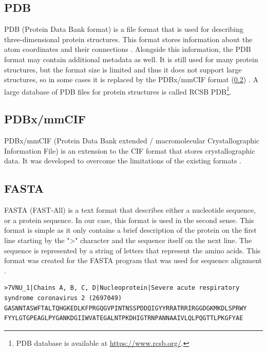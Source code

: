 \subsection{PDB}
\label{subsec:PDB}

PDB (Protein Data Bank format) is a file format that is used for describing three-dimensional protein structures. This format stores information about the atom coordinates and their connections \cite{bernstein1977protein}. Alongside this information, the PDB format may contain additional metadata as well. It is still used for many protein structures, but the format size is limited and thus it does not support large structures, so in some cases it is replaced by the PDBx/mmCIF format (\cref{subsec:PDBx_mmCIF}) \cite{adams2019announcing}. A large database of PDB files for protein structures is called RCSB PDB\footnote{PDB database is available at \url{https://www.rcsb.org/}.}.




\subsection{PDBx/mmCIF}
\label{subsec:PDBx_mmCIF}

PDBx/mmCIF (Protein Data Bank extended / macromolecular Crystallographic Information File) is an extension to the CIF format that stores crystallographic data. It was developed to overcome the limitations of the existing formats \cite{bourne199730}.

\subsection{FASTA}
\label{subsec:FASTA}

FASTA (FAST-All) is a text format that describes either a nucleotide sequence, or a protein sequence. In our case, this format is used in the second sense. This format is simple as it only contains a brief description of the protein on the first line starting by the ">" character and the sequence itself on the next line. The sequence is represented by a string of letters that represent the amino acids. This format was created for the FASTA program that was used for sequence alignment \cite{lipman1985rapid}.

\begin{lstlisting}[caption={
    An example of a FASTA file used for storing information about the 7VNU sequence.
}, breaklines=true, breakatwhitespace=false,escapechar=*]
>7VNU_1|Chains A, B, C, D|Nucleoprotein|Severe acute respiratory syndrome coronavirus 2 (2697049)
GASNNTASWFTALTQHGKEDLKFPRGQGVPINTNSSPDDQIGYYRRATRRIRGGDGKMKDLSPRWY FYYLGTGPEAGLPYGANKDGIIWVATEGALNTPKDHIGTRNPANNAAIVLQLPQGTTLPKGFYAE
\end{lstlisting}

